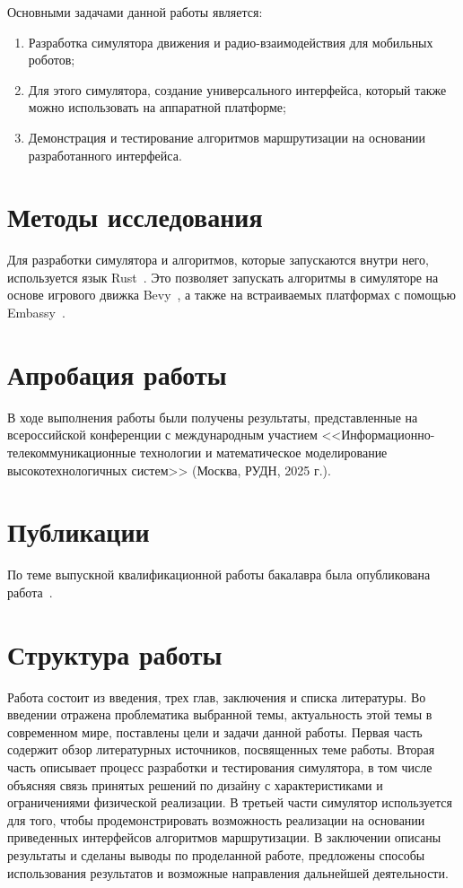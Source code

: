 \documentclass[%
]{report}
\begin{document}
\noindent Основными задачами данной работы является:

\begin{enumerate}
  \item Разработка симулятора движения и радио-взаимодействия для мобильных роботов;
  \item Для этого симулятора, создание универсального интерфейса,
  который также можно использовать на аппаратной платформе;
  \item Демонстрация и тестирование алгоритмов маршрутизации на основании разработанного интерфейса.
\end{enumerate}

\section*{Методы исследования}

Для разработки симулятора и алгоритмов, которые запускаются внутри него,
используется язык Rust~\cite{klabnik2022rust,10.1145/2692956.2663188}.
Это позволяет запускать алгоритмы в симуляторе на основе игрового движка Bevy~\cite{bevyengine},
а также на встраиваемых платформах с помощью Embassy~\cite{embassy}.

\section*{Апробация работы}

В ходе выполнения работы были получены результаты, представленные на
всероссийской конференции с международным участием
<<Информационно-телекоммуникационные технологии и математическое моделирование высокотехнологичных систем>> (Москва, РУДН, 2025 г.).


\section*{Публикации}

По теме выпускной квалификационной работы бакалавра была опубликована работа~\cite{ittmm}.

\section*{Структура работы}

Работа состоит из введения, трех глав, заключения и списка литературы.
Во введении отражена проблематика выбранной темы, актуальность этой темы в современном мире, поставлены цели и задачи данной работы.
Первая часть содержит обзор литературных источников, посвященных теме работы.
Вторая часть описывает процесс разработки и тестирования симулятора,
в том числе объясняя связь принятых решений по дизайну с характеристиками и ограничениями физической реализации.
В третьей части симулятор используется для того, чтобы продемонстрировать возможность
реализации на основании приведенных интерфейсов алгоритмов маршрутизации.
В заключении описаны результаты и сделаны выводы по проделанной работе,
предложены способы использования результатов и возможные направления дальнейшей деятельности.
\end{document}
